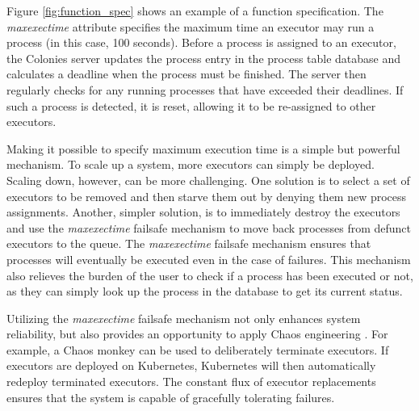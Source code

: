 \documentclass{article}
\begin{document}
Figure \ref{fig:function_spec} shows an example of a function specification. The \emph{maxexectime} attribute specifies the maximum time an executor may run a process (in this case, 100 seconds). Before a process is assigned to an executor, the Colonies server updates the process entry in the process table database and calculates a deadline when the process must be finished. The server then regularly checks for any running processes that have exceeded their deadlines. If such a process is detected, it is reset, allowing it to be re-assigned to other executors. 

Making it possible to specify maximum execution time is a simple but powerful mechanism. To scale up a system, more executors can simply be deployed. Scaling down, however, can be more challenging. One solution is to select a set of executors to be removed and then starve them out by denying them new process assignments. Another, simpler solution, is to immediately destroy the executors and use the \emph{maxexectime} failsafe mechanism to move back processes from defunct executors to the queue. The \emph{maxexectime} failsafe mechanism ensures that processes will eventually be executed even in the case of failures. This mechanism also relieves the burden of the user to check if a process has been executed or not, as they can simply look up the process in the database to get its current status. 

Utilizing the \emph{maxexectime} failsafe mechanism not only enhances system reliability, but also provides an opportunity to apply Chaos engineering \cite{chaos_engineering}. For example, a Chaos monkey can be used to deliberately terminate executors. If executors are deployed on Kubernetes, Kubernetes will then automatically redeploy terminated executors. The constant flux of executor replacements ensures that the system is capable of gracefully tolerating failures.
\end{document}
